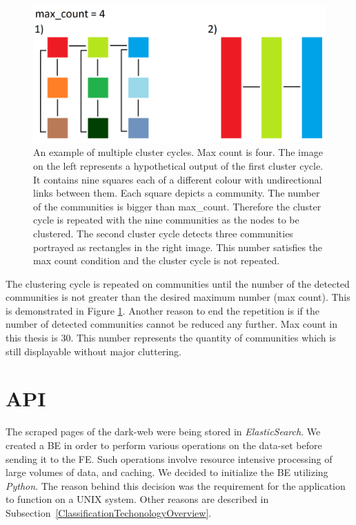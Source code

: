 \begin{figure}[ht!]
  \centering
  \includegraphics[width=\textwidth]{Images/clusteringCyclesExample.png}
  \caption{An example of multiple cluster cycles. Max count is four. The image on the left represents a hypothetical output of the first cluster cycle. It contains nine squares each of a different colour with undirectional links between them. Each square depicts a community. The number of the communities is bigger than max\_count. Therefore the cluster cycle is repeated with the nine communities as the nodes to be clustered. The second cluster cycle detects three communities portrayed as rectangles in the right image. This number satisfies the max count condition and the cluster cycle is not repeated.}
  \label{clusteringCyclesExample}
\end{figure} 

The clustering cycle is repeated on communities until the number of the detected communities is not greater than the desired maximum number (max count). This is demonstrated in Figure \ref{clusteringCyclesExample}. Another reason to end the repetition is if the number of detected communities cannot be reduced any further. Max count in this thesis is 30. This number represents the quantity of communities which is still displayable without major cluttering.




\section{API}\label{APIDevelopment}
The scraped pages of the dark-web were being stored in \textit{ElasticSearch}. We created a BE in order to perform various operations on the data-set before sending it to the FE. Such operations involve resource intensive processing of large volumes of data, and caching. We decided to initialize the BE utilizing \textit{Python}. The reason behind this decision was the requirement for the application to function on a UNIX system. Other reasons are described in Subsection~\ref{ClassificationTechonologyOverview}. 

